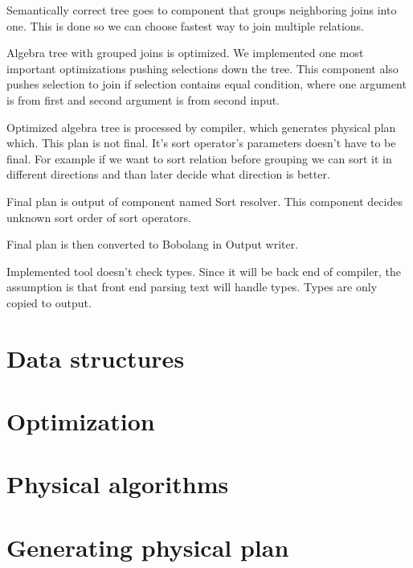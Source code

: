 Semantically correct tree goes to component that groups neighboring joins into one. This is done so we can choose fastest way to join multiple relations.

Algebra tree with grouped joins is optimized. We implemented one most important optimizations pushing selections down the tree. This component also pushes selection to join if selection contains equal condition, where one argument is from first and second argument is from second input.

Optimized algebra tree is processed by compiler, which generates physical plan which. This plan is not final. It's sort operator's parameters doesn't have to be final. For example if we want to sort relation before grouping we can sort it in different directions and than later decide what direction is better.

Final plan is output of component named Sort resolver. This component decides unknown sort order of sort operators.

Final plan is then converted to Bobolang in Output writer.

Implemented tool doesn't check types. Since it will be back end of compiler, the assumption is that front end parsing text will handle types. Types are only copied to output.

\section{Data structures}

\section{Optimization}


\section{Physical algorithms}


\section{Generating physical plan}




